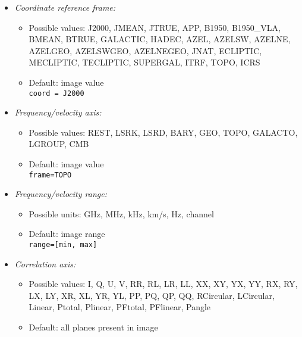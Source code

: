 \begin{itemize}

\item {\it Coordinate reference frame:}
\begin{itemize}

\item Possible values: J2000, JMEAN, JTRUE, APP, B1950, B1950\_VLA, BMEAN, BTRUE, GALACTIC, HADEC, AZEL, AZELSW, AZELNE, AZELGEO, AZELSWGEO, AZELNEGEO, JNAT, ECLIPTIC, MECLIPTIC, TECLIPTIC, SUPERGAL, ITRF, TOPO, ICRS 

\item Default: image value\\

{\tt coord = J2000}

\end{itemize}


\item {\it Frequency/velocity axis:}

\begin{itemize}

\item Possible values: REST, LSRK, LSRD, BARY, GEO, TOPO, GALACTO, LGROUP, CMB
\item Default: image value\\

{\tt frame=TOPO}
\end{itemize}


\item {\it Frequency/velocity range:}
\begin{itemize}

\item Possible units: GHz, MHz, kHz, km/s, Hz, channel
\item Default: image range\\

{\tt range=[min, max]}

\end{itemize}

\item {\it Correlation axis:}

\begin{itemize}
\item Possible values: I, Q, U, V, RR, RL, LR, LL, XX, XY, YX, YY, RX,
  RY, LX, LY, XR, XL, YR, YL, PP, PQ, QP, QQ, RCircular, LCircular,
  Linear, Ptotal, Plinear, PFtotal, PFlinear, Pangle 
\item Default: all planes present in image\\


\end{itemize}
\end{itemize}
